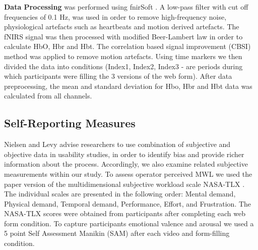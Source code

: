 \documentclass[../main/Feedback.tex]{subfiles}
\begin{document}
\textbf{Data Processing} was performed using fnirSoft \cite{ayazfunctional}.
A low-pass filter with cut off frequencies of 0.1 Hz, was used in order to remove high-frequency noise, physiological artefacts such as heartbeats and motion derived artefacts.
The fNIRS signal was then processed with modified Beer-Lambert law \cite{cope1988system} in order to calculate HbO, Hbr and Hbt.
The correlation based signal improvement (CBSI) \cite{cui2010functional} method was applied to remove motion artefacts. 
Using time markers we then divided the data into conditions (Index1, Index2, Index3 - are periods during which participants were filling the 3 versions of the web form).
After data preprocessing, the mean and standard deviation for Hbo, Hbr and Hbt data was calculated from all channels.


\subsection{Self-Reporting Measures}
Nielsen and Levy \cite{nielsen1994measuring} advise researchers to use combination of subjective and objective data in usability studies, in order to identify bias and provide richer information about the process. Accordingly, we also examine related subjective measurements within our study. To assess operator perceived MWL we used the paper version of the multidimensional subjective workload scale NASA-TLX \cite{nasatlx}.
The individual scales are presented in the following order: Mental demand, Physical demand, Temporal demand, Performance, Effort, and Frustration.
The NASA-TLX scores were obtained from participants after completing each web form condition. To capture participants emotional valence and arousal we used a 5 point Self Assessment Manikin (SAM) \cite{bradley1994measuring} after each video and form-filling condition.
\end{document}
